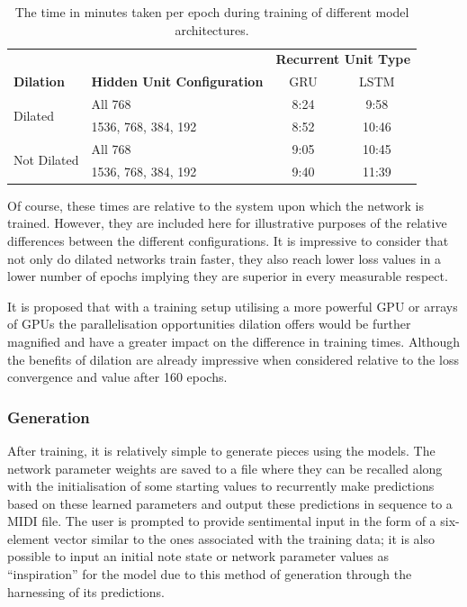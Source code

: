 \documentclass[12pt,]{article}
\begin{document}
\setlength\extrarowheight{1pt}
\begin{table}[H]
\centering
\caption{The time in minutes taken per epoch during training of different model architectures.}
\vspace{1em}
\begin{tabular}{llcc} 
\toprule
                             &                                    & \multicolumn{2}{c}{\textbf{Recurrent Unit Type}}  \\
\textbf{Dilation}            & \textbf{Hidden Unit Configuration} & GRU   & LSTM                                      \\ 
\hline
\multirow{2}{*}{Dilated}     & All 768                            & 8:24  & 9:58                                      \\ 
                             & 1536, 768, 384, 192                & 8:52  & 10:46                                     \\ 
\multirow{2}{*}{Not Dilated} & All 768                            & 9:05  & 10:45                                     \\ 
                             & 1536, 768, 384, 192                & 9:40  & 11:39                                     \\
\bottomrule
\end{tabular}
\end{table}

Of course, these times are relative to the system upon which the network
is trained. However, they are included here for illustrative purposes of
the relative differences between the different configurations. It is
impressive to consider that not only do dilated networks train faster,
they also reach lower loss values in a lower number of epochs implying
they are superior in every measurable respect.

It is proposed that with a training setup utilising a more powerful GPU
or arrays of GPUs the parallelisation opportunities dilation offers
would be further magnified and have a greater impact on the difference
in training times. Although the benefits of dilation are already
impressive when considered relative to the loss convergence and value
after 160 epochs.

\hypertarget{generation}{%
\subsubsection{Generation}\label{generation}}

After training, it is relatively simple to generate pieces using the
models. The network parameter weights are saved to a file where they can
be recalled along with the initialisation of some starting values to
recurrently make predictions based on these learned parameters and
output these predictions in sequence to a MIDI file. The user is
prompted to provide sentimental input in the form of a six-element
vector similar to the ones associated with the training data; it is also
possible to input an initial note state or network parameter values as
``inspiration'' for the model due to this method of generation through
the harnessing of its predictions.
\end{document}
